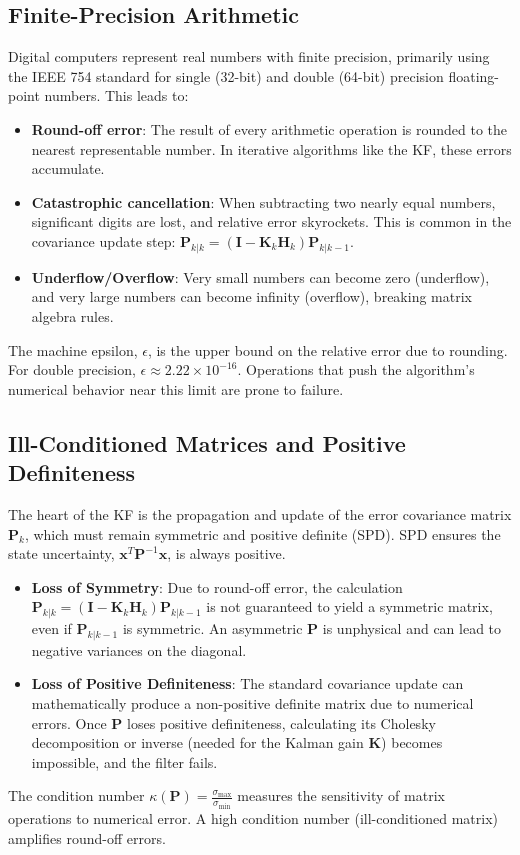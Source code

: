 \documentclass[11pt]{article}
\begin{document}
\subsection{Finite-Precision Arithmetic}
Digital computers represent real numbers with finite precision, primarily using the IEEE 754 standard for single (32-bit) and double (64-bit) precision floating-point numbers. This leads to:
\begin{itemize}
    \item \textbf{Round-off error}: The result of every arithmetic operation is rounded to the nearest representable number. In iterative algorithms like the KF, these errors accumulate.
    \item \textbf{Catastrophic cancellation}: When subtracting two nearly equal numbers, significant digits are lost, and relative error skyrockets. This is common in the covariance update step: $\bm{P}_{k|k} = (\bm{I} - \bm{K}_k \bm{H}_k) \bm{P}_{k|k-1}$.
    \item \textbf{Underflow/Overflow}: Very small numbers can become zero (underflow), and very large numbers can become infinity (overflow), breaking matrix algebra rules.
\end{itemize}
The machine epsilon, $\epsilon$, is the upper bound on the relative error due to rounding. For double precision, $\epsilon \approx 2.22 \times 10^{-16}$. Operations that push the algorithm's numerical behavior near this limit are prone to failure.

\subsection{Ill-Conditioned Matrices and Positive Definiteness}
The heart of the KF is the propagation and update of the error covariance matrix $\bm{P}_k$, which must remain symmetric and positive definite (SPD). SPD ensures the state uncertainty, $\bm{x}^T \bm{P}^{-1} \bm{x}$, is always positive.
\begin{itemize}
    \item \textbf{Loss of Symmetry}: Due to round-off error, the calculation $\bm{P}_{k|k} = (\bm{I} - \bm{K}_k \bm{H}_k) \bm{P}_{k|k-1}$ is not guaranteed to yield a symmetric matrix, even if $\bm{P}_{k|k-1}$ is symmetric. An asymmetric $\bm{P}$ is unphysical and can lead to negative variances on the diagonal.
    \item \textbf{Loss of Positive Definiteness}: The standard covariance update can mathematically produce a non-positive definite matrix due to numerical errors. Once $\bm{P}$ loses positive definiteness, calculating its Cholesky decomposition or inverse (needed for the Kalman gain $\bm{K}$) becomes impossible, and the filter fails.
\end{itemize}
The condition number $\kappa(\bm{P}) = \frac{\sigma_{\text{max}}}{\sigma_{\text{min}}}$ measures the sensitivity of matrix operations to numerical error. A high condition number (ill-conditioned matrix) amplifies round-off errors.
\end{document}
